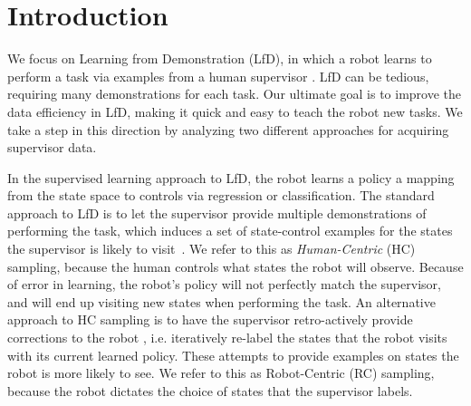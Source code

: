 \documentclass[10pt, conference]{ieeeconf}      %
\begin{document}
\section{Introduction} 

We focus on Learning from Demonstration (LfD), in which a robot learns to perform a task via examples from a human supervisor \cite{abbeel2008apprenticeship,argall2009surveyross,2010reduction,laskeyshiv}.  LfD can be tedious, requiring many demonstrations for each task. Our ultimate goal is to improve the data efficiency in LfD, making it quick and easy to teach the robot new tasks. We take a step in this direction by analyzing two different approaches for acquiring supervisor data. 

In the supervised learning approach to LfD, the robot learns a policy a mapping from the state space to controls  via regression or classification. The standard approach to LfD is to let the supervisor provide multiple demonstrations of performing the task, which induces a set of state-control examples for the states the supervisor is likely to visit~\cite{pomerleau1989alvinn}. We refer to this as \emph{Human-Centric} (HC) sampling, because the human controls what states the robot will observe. Because of error in learning, the robot's policy will not perfectly match the supervisor, and will end up visiting new states when performing the task. An alternative approach to HC sampling is to have the supervisor retro-actively provide corrections to the robot \cite{ross2010efficient,ross2010reduction,laskeyrobot,laskeyshiv,he2012imitation}, i.e. iteratively re-label the states that the robot visits with its current learned policy.
These attempts to provide examples on states the robot is more likely to see.  We refer to this as Robot-Centric (RC) sampling, because the robot dictates the choice of states that the supervisor labels.
\end{document}

